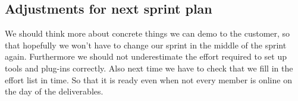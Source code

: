 \documentclass{scrartcl}
\begin{document}
\subsection{Adjustments for next sprint plan}
We should think more about concrete things we can demo to the customer, so that hopefully we won't have to change our sprint in the middle of the sprint again. Furthermore we should not underestimate the effort required to set up tools and plug-ins correctly. Also next time we have to check that we fill in the effort list in time. So that it is ready even when not every member is online on the day of the deliverables.
\end{document}
